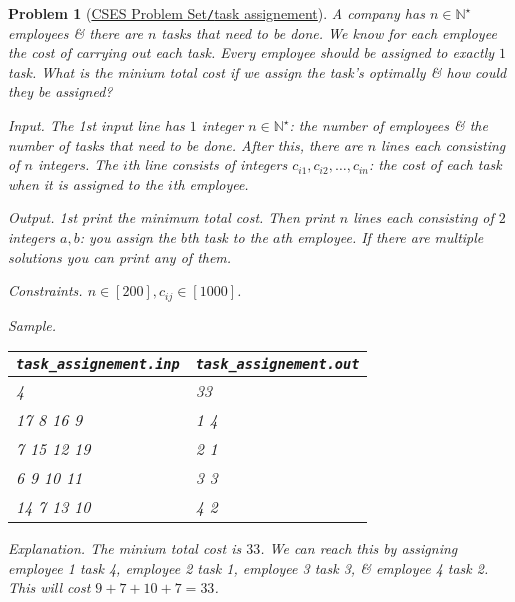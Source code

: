 \documentclass{article}
\newtheorem{problem}{Problem}
\begin{document}
\begin{problem}[\href{https://cses.fi/problemset/task/2129}{CSES Problem Set{\tt/}task assignement}]
    A company has $n\in\mathbb{N}^\star$ employees \& there are $n$ tasks that need to be done. We know for each employee the cost of carrying out each task. Every employee should be assigned to exactly $1$ task. What is the minium total cost if we assign the task's optimally \& how could they be assigned?
    \item {\sf Input.} The 1st input line has $1$ integer $n\in\mathbb{N}^\star$: the number of employees \& the number of tasks that need to be done. After this, there are $n$ lines each consisting of $n$ integers. The $i$th line consists of integers $c_{i1},c_{i2},\ldots,c_{in}$: the cost of each task when it is assigned to the $i$th employee.
    \item {\sf Output.} 1st print the minimum total cost. Then print $n$ lines each consisting of $2$ integers $a,b$: you assign the $b$th task to the $a$th employee. If there are multiple solutions you can print any of them.
    \item {\sf Constraints.} $n\in[200],c_{ij}\in[1000]$.
    \item {\sf Sample.}
    \begin{table}[H]
        \centering
        \begin{tabular}{|l|l|}
            \hline
            \verb|task_assignement.inp| & \verb|task_assignement.out| \\
            \hline
            4 & 33 \\
            17 8 16 9 & 1 4 \\
            7 15 12 19 & 2 1 \\
            6 9 10 11 & 3 3 \\
            14 7 13 10 & 4 2 \\
            \hline
        \end{tabular}
    \end{table}
    \item {\sf Explanation.} The minium total cost is $33$. We can reach this by assigning employee 1 task 4, employee 2 task 1, employee 3 task 3, \& employee 4 task 2. This will cost $9 + 7 + 10 + 7 = 33$.
\end{problem}
\end{document}
